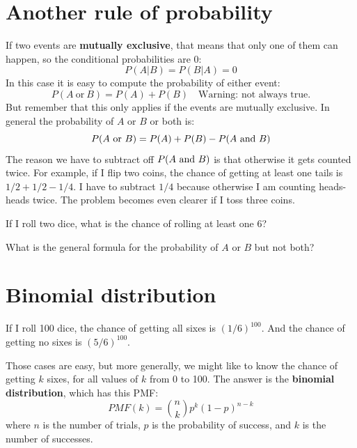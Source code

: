 \documentclass[12pt]{book}
\begin{document}
\section{Another rule of probability}

\newcommand{\OR}{~\mbox{or}~}
\newcommand{\NOT}{~\mbox{not}~}

If two events are {\bf mutually exclusive}, that means that only
one of them can happen, so the conditional probabilities are 0:
%
\[ P(A|B) = P(B|A) = 0 \]
%
In this case it is easy to compute the probability of either event:
%
\[ P(A \OR B) = P(A) + P(B)   \quad \mbox{Warning: not always true.} \]
%
But remember that this only applies if the events are mutually
exclusive.  In general the probability of $A$ or $B$ or both is:
%
\[ P(A \OR B) = P(A) + P(B) - P(A \AND B) \]
%
The reason we have to subtract off $P(A ~\mbox{and}~ B)$ is that otherwise it
gets counted twice.  For example, if I flip two coins, the chance of
getting at least one tails is $1/2 + 1/2 - 1/4$.  I have to subtract
$1/4$ because otherwise I am counting heads-heads twice.  The problem
becomes even clearer if I toss three coins.


\begin{exercise}
If I roll two dice, what is the chance of rolling at least one 6?



\end{exercise}

\begin{exercise}
What is the general formula for the probability of $A$ or $B$ but not both?


\end{exercise}


\section{Binomial distribution}

If I roll 100 dice, the chance of getting all sixes is
$(1/6)^{100}$.  And the chance of getting no sixes is $(5/6)^{100}$.

Those cases are easy, but more generally, we might like to know the
chance of getting $k$ sixes, for all values of $k$ from 0 to 100.  The
answer is the {\bf binomial distribution}, which has this PMF:
%
\[ PMF(k) = \binom{n}{k} p^k (1-p)^{n-k}\]
%
where $n$ is the number of trials, $p$ is the probability of success,
and $k$ is the number of successes.
\end{document}
